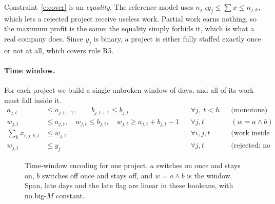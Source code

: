 \documentclass[10pt,a4paper]{article}
\theoremstyle{plain}
\theoremstyle{definition}
\theoremstyle{remark}
\begin{document}
Constraint~\eqref{c:cover} is an \emph{equality}. The reference model uses
$n_{j,k}y_j \le \sum x \le n_{j,k}$, which lets a rejected project receive useless work. Partial work
earns nothing, so the maximum profit is the same; the equality simply forbids it, which is what a
real company does. Since $y_j$ is binary, a project is either fully staffed exactly once or not at
all, which covers rule R5.

\paragraph{Time window.}
For each project we build a single unbroken window of days, and all of its work must fall inside it.
\begin{align}
a_{j,t} &\le a_{j,t+1}, \qquad b_{j,t+1} \le b_{j,t}
  && \forall j,\ t<h && \text{(monotone)} \label{c:mono}\\
w_{j,t} &\le a_{j,t},\quad w_{j,t}\le b_{j,t},\quad w_{j,t}\ge a_{j,t}+b_{j,t}-1
  && \forall j,t && (w = a\wedge b) \label{c:and}\\
\sum_{k} x_{i,j,k,t} &\le w_{j,t}
  && \forall i,j,t && \text{(work inside the window)} \label{c:inside}\\
w_{j,t} &\le y_j && \forall j,t && \text{(rejected: no window)} \label{c:wy}
\end{align}

\begin{figure}[!htbp]
\centering
{}
\caption{Time-window encoding for one project. $a$ switches on once and stays on, $b$ switches off
once and stays off, and $w=a\wedge b$ is the window. Span, late days and the late flag are linear
in these booleans, with no big-$M$ constant.}
\label{fig:window}
\end{figure}
\end{document}
